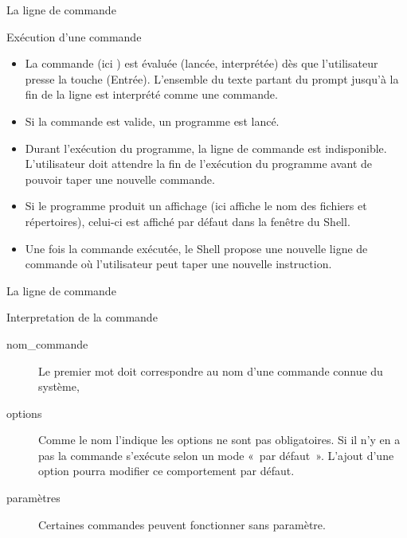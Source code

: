 \begin{frame}{La ligne de commande}
  \begin{center}
  \end{center}
  \begin{block}{Exécution d'une commande}
    \begin{itemize}
    \item La commande (ici ) est évaluée (lancée, interprétée)
      dès que l'utilisateur presse la touche \Return
      (Entrée). L'ensemble du texte partant du prompt jusqu'à la fin de
      la ligne est interprété comme une commande.
    \item Si la commande est valide, un programme est lancé.
    \item Durant l'exécution du programme, la ligne de commande est
      indisponible. L'utilisateur doit attendre la fin de l'exécution du
      programme avant de pouvoir taper une nouvelle commande.
    \item Si le programme produit un affichage (ici  affiche le
      nom des fichiers et répertoires), celui-ci est affiché par défaut
      dans la fenêtre du Shell.
    \item Une fois la commande exécutée, le Shell propose une nouvelle
      ligne de commande où l'utilisateur peut taper une nouvelle
      instruction.
    \end{itemize}
  \end{block}
\end{frame}
\begin{frame}{La ligne de commande}
  \begin{center}
  \end{center}
  \begin{block}{Interpretation de la commande}
    \begin{description}
    \item[nom\_commande] Le premier mot doit correspondre au nom d'une
      commande connue du système,
    \item[options] Comme le nom l'indique les options ne sont pas
      obligatoires. Si il n'y en a pas la commande s'exécute selon un
      mode «~par défaut~». L'ajout d'une option pourra modifier ce
      comportement par défaut.
    \item[paramètres] Certaines commandes peuvent fonctionner sans
      paramètre.
    \end{description}
  \end{block}
\end{frame}

